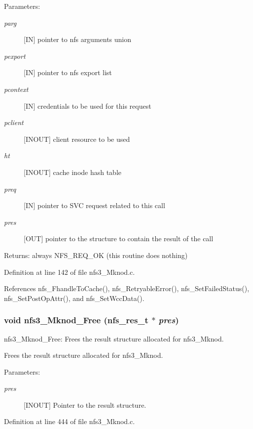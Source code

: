 \begin{Desc}
\item[Parameters:]
\begin{description}
\item[{\em parg}][IN] pointer to nfs arguments union \item[{\em pexport}][IN] pointer to nfs export list \item[{\em pcontext}][IN] credentials to be used for this request \item[{\em pclient}][INOUT] client resource to be used \item[{\em ht}][INOUT] cache inode hash table \item[{\em preq}][IN] pointer to SVC request related to this call \item[{\em pres}][OUT] pointer to the structure to contain the result of the call\end{description}
\end{Desc}
\begin{Desc}
\item[Returns:]always NFS\_\-REQ\_\-OK (this routine does nothing) \end{Desc}


Definition at line 142 of file nfs3\_\-Mknod.c.

References nfs\_\-Fhandle\-To\-Cache(), nfs\_\-Retryable\-Error(), nfs\_\-Set\-Failed\-Status(), nfs\_\-Set\-Post\-Op\-Attr(), and nfs\_\-Set\-Wcc\-Data().
\subsubsection{\setlength{\rightskip}{0pt plus 5cm}void nfs3\_\-Mknod\_\-Free (nfs\_\-res\_\-t $\ast$ {\em pres})}\label{nfs3__Mknod_8c_a1}


nfs3\_\-Mknod\_\-Free: Frees the result structure allocated for nfs3\_\-Mknod.

Frees the result structure allocated for nfs3\_\-Mknod.

\begin{Desc}
\item[Parameters:]
\begin{description}
\item[{\em pres}][INOUT] Pointer to the result structure. \end{description}
\end{Desc}


Definition at line 444 of file nfs3\_\-Mknod.c.